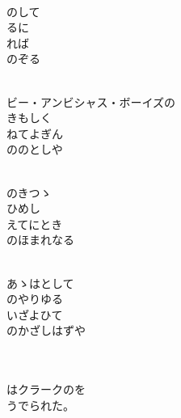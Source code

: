 \documentclass[10pt,b5j]{tarticle} %
\begin{document}
\vspace{1.5em} %
\newcommand{\linespace}{0.5em} %
\newcommand{\blocksize}{0.5\hsize} %
\newcommand{\itemmargin}{6em} %
\begin{enumerate} %
    \setlength{\itemindent}{\itemmargin} %
    \begin{minipage}[c]{\blocksize}
    
        \vspace{\linespace}
        \item~\\
        のして\\
        るに\\
        れば\\
        のぞる
        
        \vspace{\linespace}
        \item~\\
        ビー・アンビシャス・ボーイズの\\
        きもしく\\
        ねてよぎん\\
        ののとしや
        
        \vspace{\linespace}
        \item~\\
        のきつゝ\\
        ひめし\\
        えてにとき\\
        のほまれなる
        
        \vspace{\linespace}
        \item~\\
        あゝはとして\\
        のやりゆる\\
        いざよひて\\
        のかざしはずや
        
        
        \vspace{\linespace}
        \item~\\
        \\
        はクラークのを\\
        うでられた。
    
    \end{minipage}
\end{enumerate} %
\end{document}
